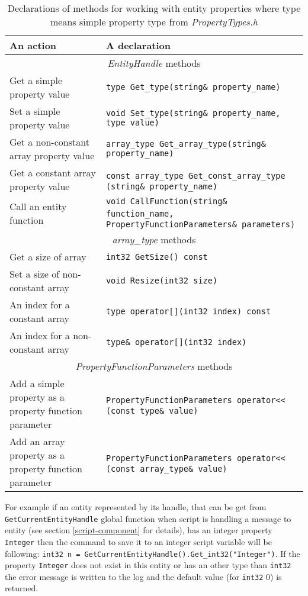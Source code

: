 \begin{table}[htbp]
	\centering
		{\scriptsize 
		\begin{tabular}{|p{0.38\hsize}|p{0.55\hsize}|}
			\hline
			An action & A declaration\\
			\hline
			\multicolumn{2}{|c|}{\emph{EntityHandle} methods}\\
			\hline
			Get a simple property value & \verb/type Get_type(string& property_name)/\\
			Set a simple property value & \verb/void Set_type(string& property_name, type value)/\\
			Get a non-constant array property value & \verb/array_type Get_array_type(string& property_name)/\\
			Get a constant array property value & \verb/const array_type Get_const_array_type/ \verb/  (string& property_name)/\\
			Call an entity function & \verb/void CallFunction(string& function_name,/ \verb/  PropertyFunctionParameters& parameters)/\\
			\hline
			\multicolumn{2}{|c|}{\emph{array\_type} methods}\\
			\hline
			Get a size of array & \verb/int32 GetSize() const/\\
			Set a size of non-constant array & \verb/void Resize(int32 size)/\\
			An index for a constant array & \verb/type operator[](int32 index) const/\\
			An index for a non-constant array & \verb/type& operator[](int32 index)/\\
			\hline
			\multicolumn{2}{|c|}{\emph{PropertyFunctionParameters} methods}\\
			\hline
			Add a simple property as a property function parameter & \verb/PropertyFunctionParameters operator<</ \verb/  (const type& value)/\\
			Add an array property as a property function parameter & \verb/PropertyFunctionParameters operator<</ \verb/  (const array_type& value)/\\
			\hline
		\end{tabular}
		}
	\caption[Working with entity properties]{Declarations of methods for working with entity properties where type means simple property type from \emph{PropertyTypes.h}}
	\label{tab:script-properties}
\end{table}

For example if an entity represented by its handle, that can be get from \verb/GetCurrentEntityHandle/ global function when script is handling a message to entity (see section \ref{script-component} for details), has an integer property \verb/Integer/ then the command to save it to an integer script variable will be following: \verb/int32 n = GetCurrentEntityHandle().Get_int32("Integer")/. If the property \verb/Integer/ does not exist in this entity or has an other type than \verb/int32/ the error message is written to the log and the default value (for \verb/int32/ 0) is returned.

